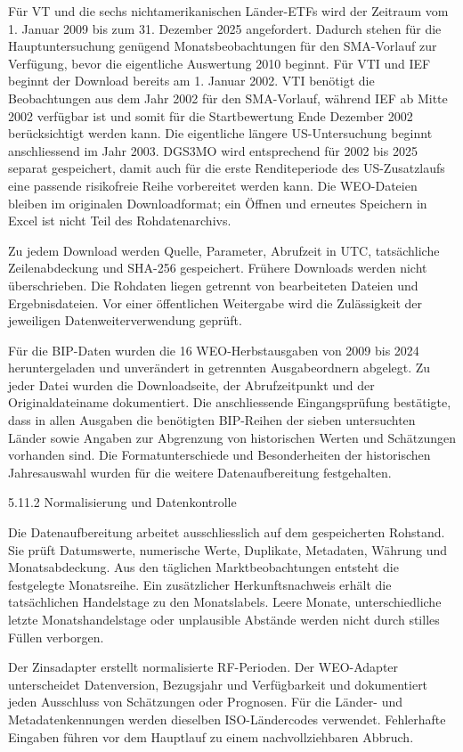 \documentclass[
  ngerman,
  a4paper,
  DIV=11,
  oneside]{scrreprt}
\begin{document}
Für VT und die sechs nichtamerikanischen Länder-ETFs wird der Zeitraum
vom 1. Januar 2009 bis zum 31. Dezember 2025 angefordert. Dadurch stehen
für die Hauptuntersuchung genügend Monatsbeobachtungen für den
SMA-Vorlauf zur Verfügung, bevor die eigentliche Auswertung 2010
beginnt. Für VTI und IEF beginnt der Download bereits am 1. Januar 2002.
VTI benötigt die Beobachtungen aus dem Jahr 2002 für den SMA-Vorlauf,
während IEF ab Mitte 2002 verfügbar ist und somit für die Startbewertung
Ende Dezember 2002 berücksichtigt werden kann. Die eigentliche längere
US-Untersuchung beginnt anschliessend im Jahr 2003. DGS3MO wird
entsprechend für 2002 bis 2025 separat gespeichert, damit auch für die
erste Renditeperiode des US-Zusatzlaufs eine passende risikofreie Reihe
vorbereitet werden kann. Die WEO-Dateien bleiben im originalen
Downloadformat; ein Öffnen und erneutes Speichern in Excel ist nicht
Teil des Rohdatenarchivs.

Zu jedem Download werden Quelle, Parameter, Abrufzeit in UTC,
tatsächliche Zeilenabdeckung und SHA-256 gespeichert. Frühere Downloads
werden nicht überschrieben. Die Rohdaten liegen getrennt von
bearbeiteten Dateien und Ergebnisdateien. Vor einer öffentlichen
Weitergabe wird die Zulässigkeit der jeweiligen Datenweiterverwendung
geprüft.

Für die BIP-Daten wurden die 16 WEO-Herbstausgaben von 2009 bis 2024
heruntergeladen und unverändert in getrennten Ausgabeordnern abgelegt.
Zu jeder Datei wurden die Downloadseite, der Abrufzeitpunkt und der
Originaldateiname dokumentiert. Die anschliessende Eingangsprüfung
bestätigte, dass in allen Ausgaben die benötigten BIP-Reihen der sieben
untersuchten Länder sowie Angaben zur Abgrenzung von historischen Werten
und Schätzungen vorhanden sind. Die Formatunterschiede und
Besonderheiten der historischen Jahresauswahl wurden für die weitere
Datenaufbereitung festgehalten.

5.11.2 Normalisierung und Datenkontrolle

Die Datenaufbereitung arbeitet ausschliesslich auf dem gespeicherten
Rohstand. Sie prüft Datumswerte, numerische Werte, Duplikate, Metadaten,
Währung und Monatsabdeckung. Aus den täglichen Marktbeobachtungen
entsteht die festgelegte Monatsreihe. Ein zusätzlicher Herkunftsnachweis
erhält die tatsächlichen Handelstage zu den Monatslabels. Leere Monate,
unterschiedliche letzte Monatshandelstage oder unplausible Abstände
werden nicht durch stilles Füllen verborgen.

Der Zinsadapter erstellt normalisierte RF-Perioden. Der WEO-Adapter
unterscheidet Datenversion, Bezugsjahr und Verfügbarkeit und
dokumentiert jeden Ausschluss von Schätzungen oder Prognosen. Für die
Länder- und Metadatenkennungen werden dieselben ISO-Ländercodes
verwendet. Fehlerhafte Eingaben führen vor dem Hauptlauf zu einem
nachvollziehbaren Abbruch.
\end{document}
